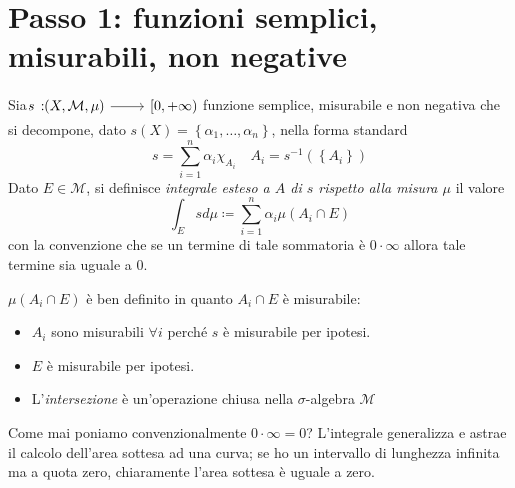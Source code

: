 \section{Passo 1: funzioni semplici, misurabili, non negative}
\begin{define}
	Sia $\funz{s}{\left(X,\mathcal{M},\mu\right)}{\left[0,+\infty\right)}$ funzione semplice, misurabile e non negativa che si decompone, dato $s\left(X\right)=\left\{\alpha_1,\ldots, \alpha_n\right\}$, nella forma standard
	\begin{equation*}
		s=\sum_{i=1}^{n}\alpha_i\chi_{A_i}\quad A_i=s^{-1}\left(\left\{A_i\right\}\right)
	\end{equation*}
	Dato $E\in\mathcal{M}$, si definisce \textit{integrale esteso a $A$ di $s$ rispetto alla misura $\mu$} il valore
	\begin{equation}
		\int_{E}sd\mu\coloneqq\sum_{i=1}^{n}\alpha_i\mu\left(A_i\cap E\right)
	\end{equation}
	con la convenzione che se un termine di tale sommatoria è $0\cdot \infty$ allora tale termine sia uguale a $0$.
\end{define}
\begin{observe}
	$\mu\left(A_i\cap E\right)$ è ben definito in quanto $A_i\cap E$ è misurabile:
	\begin{itemize}
		\item $A_i$ sono misurabili $\forall i$ perché $s$ è misurabile per ipotesi.
		\item $E$ è misurabile per ipotesi.
		\item L'\textit{intersezione} è un'operazione chiusa nella $\sigma$-algebra $\mathcal{M}$
	\end{itemize}
\end{observe}
\begin{observe}
	Come mai poniamo convenzionalmente $0\cdot \infty=0$? L'integrale generalizza e astrae il calcolo dell'area sottesa ad una curva; se ho un intervallo di lunghezza infinita ma a quota zero, chiaramente l'area sottesa è uguale a zero.
\end{observe}
